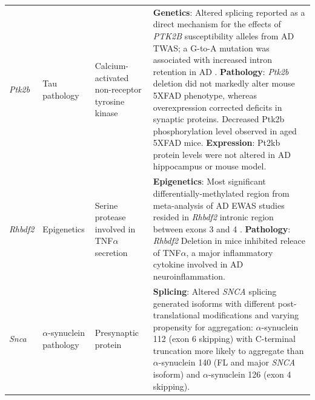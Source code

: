 \begin{landscape}
\begin{longtable}[c]{p{1cm}p{2cm}p{4cm}p{19cm}}
			\centering \textit{Ptk2b} &
			\centering Tau pathology  &
			\centering Calcium-activated non-receptor tyrosine kinase &			
			\tabitem \textbf{Genetics}: Altered splicing reported as a direct mechanism for the effects of \textit{PTK2B} susceptibility alleles from AD TWAS; a G-to-A mutation was associated with increased intron retention in AD \cite{Raj2018}.\newline
			\tabitem \textbf{Pathology}: \textit{Ptk2b} deletion did not markedly alter mouse 5XFAD phenotype, whereas overexpression corrected deficits in synaptic proteins. Decreased Ptk2b phosphorylation level observed in aged 5XFAD mice.\newline
			\tabitem \textbf{Expression}: Pt2kb protein levels were not altered in AD hippocampus or mouse model\cite{Giralt2018}.\\
			\hdashline[0.5pt/5pt]					
		
			\centering \textit{Rhbdf2} &
			\centering Epigenetics  &
			\centering Serine protease involved in TNF$\alpha$ secretion &
			\tabitem \textbf{Epigenetics}: Most significant differentially-methylated region from meta-analysis of AD EWAS studies resided in \textit{Rhbdf2} intronic region between exons 3 and 4 \cite{Smith2021,DeJager2014, Lardenoije2019}.\newline
			\tabitem \textbf{Pathology}: \textit{Rhbdf2} Deletion in mice inhibited releace of TNF$\alpha$, a major inflammatory cytokine involved in AD neuroinflammation\cite{Levy2020}.\\
			
			\centering \textit{Snca} &
			\centering $\alpha$-synuclein pathology  &
			\centering Presynaptic protein &
			\tabitem \textbf{Splicing}: Altered \textit{SNCA} splicing generated isoforms with different post-translational modifications and varying propensity for aggregation: $\alpha$-synuclein 112 (exon 6 skipping) with C-terminal truncation more likely to aggregate than $\alpha$-synuclein 140 (FL and major \textit{SNCA} isoform) and $\alpha$-synuclein 126 (exon 4 skipping)\cite{Beyer2012, Beyer2006}.  \\
			

\end{longtable}
\end{landscape}
